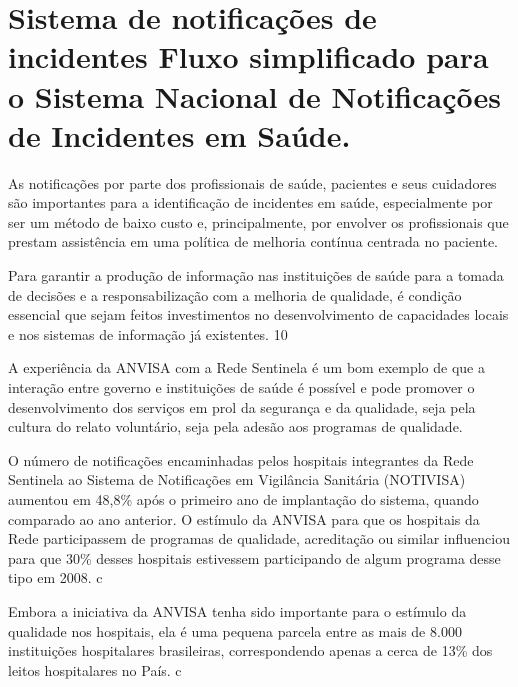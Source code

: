 \documentclass{article}
\begin{document}
\section{%
Sistema de notificações de incidentes%
Fluxo simplificado para o Sistema Nacional de Notificações de Incidentes em
              Saúde.}

As notificações por parte dos profissionais de saúde, pacientes e seus cuidadores são
        importantes para a identificação de incidentes em saúde, especialmente por ser um método de
        baixo custo e, principalmente, por envolver os profissionais que prestam assistência em uma
        política de melhoria contínua centrada no paciente.

Para garantir a produção de informação nas instituições de saúde para a tomada de decisões
        e a responsabilização com a melhoria de qualidade, é condição essencial que sejam feitos
        investimentos no desenvolvimento de capacidades locais e nos sistemas de informação já
        existentes. %
10%


A experiência da ANVISA com a Rede Sentinela é um bom exemplo de que a interação entre
        governo e instituições de saúde é possível e pode promover o desenvolvimento dos serviços em
        prol da segurança e da qualidade, seja pela cultura do relato voluntário, seja pela adesão
        aos programas de qualidade.

O número de notificações encaminhadas pelos hospitais integrantes da Rede Sentinela ao
        Sistema de Notificações em Vigilância Sanitária (NOTIVISA) aumentou em 48,8\% após o primeiro
        ano de implantação do sistema, quando comparado ao ano anterior. O estímulo da ANVISA para
        que os hospitais da Rede participassem de programas de qualidade, acreditação ou similar
        influenciou para que 30\% desses hospitais estivessem participando de algum programa desse
        tipo em 2008. %
c%


Embora a iniciativa da ANVISA tenha sido importante para o estímulo da qualidade nos
        hospitais, ela é uma pequena parcela entre as mais de 8.000 instituições hospitalares
        brasileiras, correspondendo apenas a cerca de 13\% dos leitos hospitalares no País. %
c%
\end{document}
